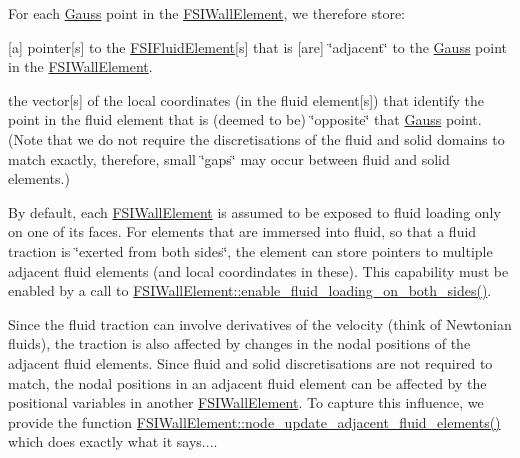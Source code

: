 For each \hyperlink{classoomph_1_1Gauss}{Gauss} point in the \hyperlink{classoomph_1_1FSIWallElement}{F\+S\+I\+Wall\+Element}, we therefore store\+:
\begin{DoxyItemize}
\item \mbox{[}a\mbox{]} pointer\mbox{[}s\mbox{]} to the \hyperlink{classoomph_1_1FSIFluidElement}{F\+S\+I\+Fluid\+Element}\mbox{[}s\mbox{]} that is \mbox{[}are\mbox{]} \char`\"{}adjacent\char`\"{} to the \hyperlink{classoomph_1_1Gauss}{Gauss} point in the \hyperlink{classoomph_1_1FSIWallElement}{F\+S\+I\+Wall\+Element}.
\item the vector\mbox{[}s\mbox{]} of the local coordinates (in the fluid element\mbox{[}s\mbox{]}) that identify the point in the fluid element that is (deemed to be) \char`\"{}opposite\char`\"{} that \hyperlink{classoomph_1_1Gauss}{Gauss} point. (Note that we do not require the discretisations of the fluid and solid domains to match exactly, therefore, small \char`\"{}gaps\char`\"{} may occur between fluid and solid elements.)
\end{DoxyItemize}By default, each \hyperlink{classoomph_1_1FSIWallElement}{F\+S\+I\+Wall\+Element} is assumed to be exposed to fluid loading only on one of its faces. For elements that are immersed into fluid, so that a fluid traction is \char`\"{}exerted from both sides\char`\"{}, the element can store pointers to multiple adjacent fluid elements (and local coordindates in these). This capability must be enabled by a call to \hyperlink{classoomph_1_1FSIWallElement_a0dc3efdeb5d0abf0ba473c0145652358}{F\+S\+I\+Wall\+Element\+::enable\+\_\+fluid\+\_\+loading\+\_\+on\+\_\+both\+\_\+sides()}.

Since the fluid traction can involve derivatives of the velocity (think of Newtonian fluids), the traction is also affected by changes in the nodal positions of the adjacent fluid elements. Since fluid and solid discretisations are not required to match, the nodal positions in an adjacent fluid element can be affected by the positional variables in another \hyperlink{classoomph_1_1FSIWallElement}{F\+S\+I\+Wall\+Element}. To capture this influence, we provide the function \hyperlink{classoomph_1_1FSIWallElement_aec47fc9fff885241c68533df8125e0a0}{F\+S\+I\+Wall\+Element\+::node\+\_\+update\+\_\+adjacent\+\_\+fluid\+\_\+elements()} which does exactly what it says....

